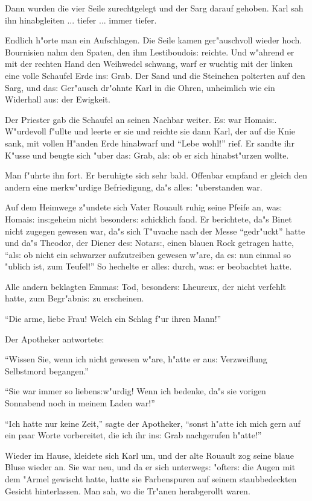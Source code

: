 \documentclass[oneside,12pt]{book}
\newcommand{\s}{s:}%
\begin{document}
Dann wurden die vier Seile zurechtgelegt und der Sarg darauf
gehoben. Karl sah ihn hinabgleiten ... tiefer ... immer tiefer.

Endlich h"orte man ein Aufschlagen. Die Seile kamen ger"auschvoll
wieder hoch. Bournisien nahm den Spaten, den ihm Lestiboudoi{\s}
reichte. Und w"ahrend er mit der rechten Hand den Weihwedel
schwang, warf er wuchtig mit der linken eine volle Schaufel Erde
in{\s} Grab. Der Sand und die Steinchen polterten auf den Sarg,
und da{\s} Ger"ausch dr"ohnte Karl in die Ohren, unheimlich wie
ein Widerhall au{\s} der Ewigkeit.

Der Priester gab die Schaufel an seinen Nachbar weiter. E{\s} war
Homai{\s}. W"urdevoll f"ullte und leerte er sie und reichte sie
dann Karl, der auf die Knie sank, mit vollen H"anden Erde
hinabwarf und "`Lebe wohl!"' rief. Er sandte ihr K"usse und beugte
sich "uber da{\s} Grab, al{\s} ob er sich hinabst"urzen wollte.

Man f"uhrte ihn fort. Er beruhigte sich sehr bald. Offenbar
empfand er gleich den andern eine merkw"urdige Befriedigung, da"s
alle{\s} "uberstanden war.

Auf dem Heimwege z"undete sich Vater Rouault ruhig seine Pfeife
an, wa{\s} Homai{\s} in{\s}geheim nicht besonder{\s} schicklich
fand. Er berichtete, da"s Binet nicht zugegen gewesen war, da"s
sich T"uvache nach der Messe "`gedr"uckt"' hatte und da"s Theodor,
der Diener de{\s} Notar{\s}, einen blauen Rock getragen hatte,
"`al{\s} ob nicht ein schwarzer aufzutreiben gewesen w"are, da
e{\s} nun einmal so "ublich ist, zum Teufel!"' So hechelte er
alle{\s} durch, wa{\s} er beobachtet hatte.

Alle andern beklagten Emma{\s} Tod, besonder{\s} Lheureux, der
nicht verfehlt hatte, zum Begr"abni{\s} zu erscheinen.

"`Die arme, liebe Frau! Welch ein Schlag f"ur ihren Mann!"'

Der Apotheker antwortete:

"`Wissen Sie, wenn ich nicht gewesen w"are, h"atte er au{\s}
Verzweiflung Selbstmord begangen."'

"`Sie war immer so lieben{\s}w"urdig! Wenn ich bedenke, da"s sie
vorigen Sonnabend noch in meinem Laden war!"'

"`Ich hatte nur keine Zeit,"' sagte der Apotheker, "`sonst h"atte
ich mich gern auf ein paar Worte vorbereitet, die ich ihr in{\s}
Grab nachgerufen h"atte!"'

Wieder im Hause, kleidete sich Karl um, und der alte Rouault zog
seine blaue Bluse wieder an. Sie war neu, und da er sich
unterweg{\s} "ofter{\s} die Augen mit dem "Armel gewischt hatte,
hatte sie Farbenspuren auf seinem staubbedeckten Gesicht
hinterlassen. Man sah, wo die Tr"anen herabgerollt waren.
\end{document}

